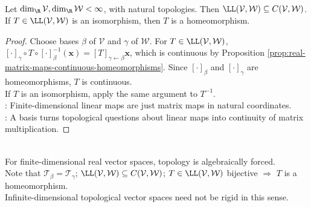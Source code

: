 \begin{corollary} \label{cor:finite-dimensional-linear-maps-continuous} \\
Let $\dim_{\R}\mathcal{V},\dim_{\R}\mathcal{W}<\infty$, with natural topologies. Then $\LL(\mathcal{V},\mathcal{W})\subseteq C(\mathcal{V},\mathcal{W})$.\\
If $T\in\LL(\mathcal{V},\mathcal{W})$ is an isomorphism, then $T$ is a homeomorphism.
\begin{proof}
Choose bases $\beta$ of $\mathcal{V}$ and $\gamma$ of $\mathcal{W}$. For $T\in\LL(\mathcal{V},\mathcal{W})$, $[\cdot]_{\gamma}\circ T\circ[\cdot]_{\beta}^{-1}(\mathbf{x}) =[T]_{\gamma\leftarrow\beta}\mathbf{x}$, which is continuous by Proposition \ref{prop:real-matrix-maps-continuous-homeomorphisms}. Since $[\cdot]_{\beta}$ and $[\cdot]_{\gamma}$ are homeomorphisms, $T$ is continuous.\\
If $T$ is an isomorphism, apply the same argument to $T^{-1}$.\\
: Finite-dimensional linear maps are just matrix maps in natural coordinates.\\
: A basis turns topological questions about linear maps into continuity of matrix multiplication.
\end{proof}
\end{corollary}

\begin{perspective} \label{per:finite-dimensional-topology-is-rigid} \\
For finite-dimensional real vector spaces, topology is algebraically forced.\\
Note that $\mathcal{T}_{\beta}=\mathcal{T}_{\gamma}$; $\LL(\mathcal{V},\mathcal{W})\subseteq C(\mathcal{V},\mathcal{W})$; $T\in\LL(\mathcal{V},\mathcal{W})$ bijective $\Rightarrow$ $T$ is a homeomorphism.\\
Infinite-dimensional topological vector spaces need not be rigid in this sense.
\end{perspective}
